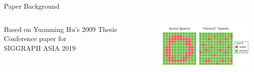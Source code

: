 \placelogofalse
\begin{frame}{Paper Background}
\begin{columns}
\centering
\begin{outline}
    \1 Based on Yuanming Hu's 2009 Thesis
    \1 Conference paper for \\ SIGGRAPH ASIA 2019
\end{outline}
\vspace{2cm}
\includegraphics[width=6cm]{taichi_sparsity.png}
\centering
{}


\end{columns}

\end{frame}
\placelogotrue

